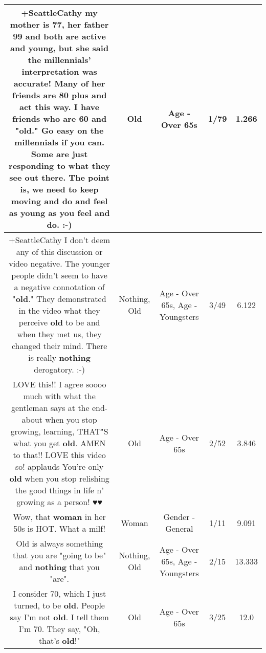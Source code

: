 \documentclass[11pt]{article}
\newlength\mylength
\begin{document}
\begin{center}
\begin{longtable}{|C{.65\mylength}|C{.30\mylength}|C{.12\mylength}|C{.12\mylength}|C{.12\mylength}|}
  \small +SeattleCathy my mother is 77, her father 99 and both are active and young, but she said the millennials' interpretation was accurate! Many of her friends are 80 plus and act this way. I have friends who are 60 and "\textbf{old}." Go easy on the millennials if you can. Some are just responding to what they see out there. The point is, we need to keep moving and do and feel as young as you feel and do. :-)\normalsize   & Old & Age - Over 65s & 1/79 & 1.266 \\  \hline
  \small +SeattleCathy I don't deem any of this discussion or video negative. The younger people didn't seem to have a negative connotation of "\textbf{old}." They demonstrated in the video what they perceive \textbf{old} to be and when they met us, they changed their mind. There is really \textbf{nothing} derogatory. :-)\normalsize   & Nothing, Old & Age - Over 65s, Age - Youngsters & 3/49 & 6.122 \\  \hline
  \small LOVE this!!  I agree soooo much with what the gentleman says at the end- about when you stop growing, learning, THAT"S what you get \textbf{old}.  AMEN to that!!  LOVE this video so!  applauds  You're only \textbf{old} when you stop relishing the good things in life n' growing as a person! ♥♥\normalsize   & Old & Age - Over 65s & 2/52 & 3.846 \\  \hline
  \small Wow, that \textbf{woman} in her 50s is HOT.  What a milf!\normalsize   & Woman & Gender - General & 1/11 & 9.091 \\  \hline
  \small Old is always something that you are "going to be" and \textbf{nothing} that you "are".\normalsize   & Nothing, Old & Age - Over 65s, Age - Youngsters & 2/15 & 13.333 \\  \hline
  \small I consider 70, which I just turned, to be \textbf{old}.  People say I'm not \textbf{old}.  I tell them I'm 70.  They say, "Oh, that's \textbf{old}!"\normalsize   & Old & Age - Over 65s & 3/25 & 12.0 \\  \hline

\end{longtable}
\end{center}
\end{document}
